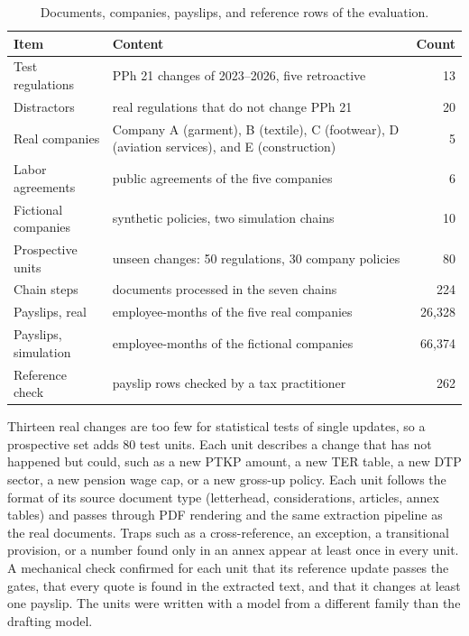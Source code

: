 \begin{table}[!t]
\caption{Documents, companies, payslips, and reference rows of the evaluation.}
\label{tab:data}
\centering\footnotesize
\setlength{\tabcolsep}{3pt}
\begin{tabularx}{\columnwidth}{@{}lLr@{}}
\toprule
Item & Content & Count \\
\midrule
Test regulations & PPh 21 changes of 2023--2026, five retroactive & 13 \\
Distractors & real regulations that do not change PPh 21 & 20 \\
Real companies & Company A (garment), B (textile), C (footwear), D (aviation services), and E (construction) & 5 \\
Labor agreements & public agreements of the five companies & 6 \\
Fictional companies & synthetic policies, two simulation chains & 10 \\
Prospective units & unseen changes: 50 regulations, 30 company policies & 80 \\
Chain steps & documents processed in the seven chains & 224 \\
Payslips, real & employee-months of the five real companies & 26,328 \\
Payslips, simulation & employee-months of the fictional companies & 66,374 \\
Reference check & payslip rows checked by a tax practitioner & 262 \\
\bottomrule
\end{tabularx}
\end{table}

Thirteen real changes are too few for statistical tests of single updates, so a prospective set adds 80 test units. Each unit describes a change that has not happened but could, such as a new PTKP amount, a new TER table, a new DTP sector, a new pension wage cap, or a new gross-up policy. Each unit follows the format of its source document type (letterhead, considerations, articles, annex tables) and passes through PDF rendering and the same extraction pipeline as the real documents. Traps such as a cross-reference, an exception, a transitional provision, or a number found only in an annex appear at least once in every unit. A mechanical check confirmed for each unit that its reference update passes the gates, that every quote is found in the extracted text, and that it changes at least one payslip. The units were written with a model from a different family than the drafting model.

